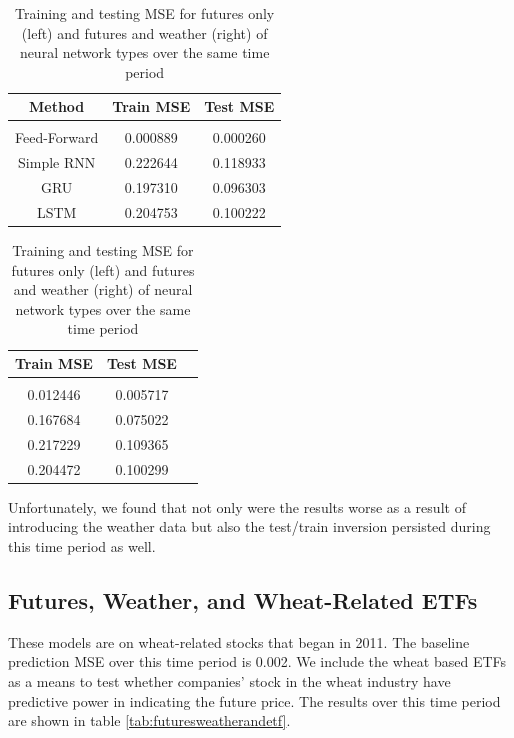 \documentclass[twoside,11pt]{article}
\begin{document}
\begin{table}[h!]
	\begin{center}
		\begin{tabular}{ccc}
			Method & Train MSE & Test MSE \\
			\hline \\[-11pt]
			Feed-Forward & 0.000889 & 0.000260 \\
			Simple RNN & 0.222644 & 0.118933 \\ 
			GRU & 0.197310 & 0.096303 \\
			LSTM & 0.204753 & 0.100222 \\
			\hline
		\end{tabular}
	\vline
		\begin{tabular}{ccc}
			Train MSE & Test MSE \\
			\hline \\[-11pt]
			0.012446 & 0.005717 \\
			0.167684 & 0.075022 \\ 
			0.217229 & 0.109365 \\
			0.204472 & 0.100299 \\
			\hline
		\end{tabular}
		
		\caption{Training and testing MSE for futures only (left) and futures and weather (right) of neural network types over the same time period}\label{tab:futuresandweather}
	\end{center}
\end{table}

Unfortunately, we found that not only were the results worse as a result of introducing the weather data but also the test/train inversion persisted during this time period as well.

\subsection{Futures, Weather, and Wheat-Related ETFs}

These models are on wheat-related stocks that began in 2011. The baseline prediction MSE over this time period is 0.002. We include the wheat based ETFs as a means to test whether companies' stock in the wheat industry have predictive power in indicating the future price. The results over this time period are shown in table \ref{tab:futuresweatherandetf}.
\end{document}
